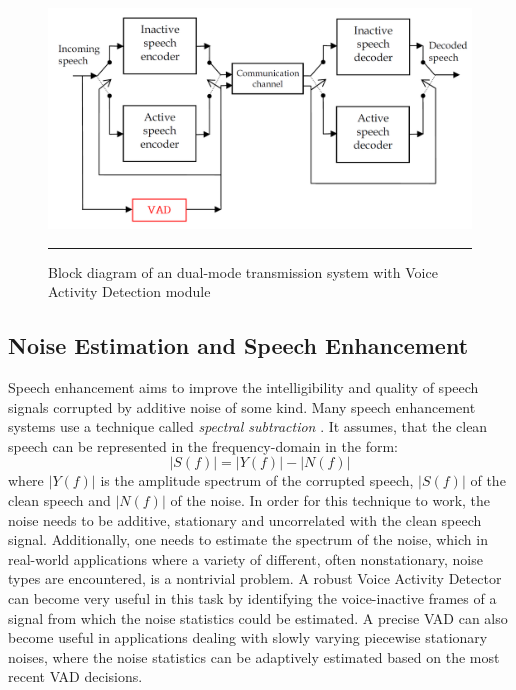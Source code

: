 \begin{figure}[htbp]
	\centering
		\includegraphics[width=1\columnwidth]{Figures/DTXVAD.png}
		\rule{37em}{0.5pt}
	\caption[Dual-mode transmission system with Voice Activity Detection module]{Block diagram of an dual-mode transmission system with Voice Activity Detection module \cite{G729}}
	\label{fig:DTXVAD}
\end{figure}

\subsection{Noise Estimation and Speech Enhancement}

Speech enhancement aims to improve the intelligibility and quality of speech signals corrupted by additive  noise of some kind. Many speech enhancement systems use a technique called \emph{spectral subtraction} \cite{Kondoz, RamirezGorriz}. It assumes, that the clean speech can be represented in the frequency-domain in the form:
\begin{equation}
|S(f)| = |Y(f)| - |N(f)|
\end{equation}
where $|Y(f)|$ is the amplitude spectrum of the corrupted speech, $|S(f)|$ of the clean speech and $|N(f)|$ of the noise. In order for this technique to work, the noise needs to be additive, stationary and uncorrelated with the clean speech signal. Additionally, one needs to estimate the spectrum of the noise, which in real-world applications where a variety of different, often nonstationary, noise types are encountered, is a nontrivial problem. A robust Voice Activity Detector can become very useful in this task by identifying the voice-inactive frames of a signal from which the noise statistics could be estimated. A precise VAD can also become useful in applications dealing with slowly varying piecewise stationary noises, where the noise statistics can be adaptively estimated based on the most recent VAD decisions.

